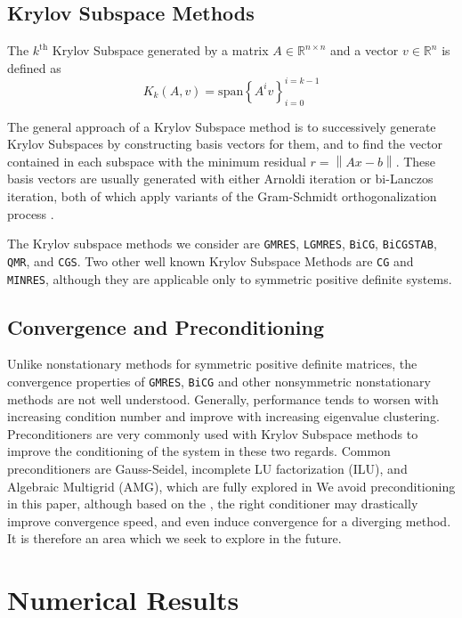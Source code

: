 \documentclass[10pt]{article}
\newcommand\norm[1]{\left\lVert #1 \right\rVert}
\begin{document}
\begin{multicols}{2}
\subsection{Krylov Subspace Methods}

The $k^{\mbox{th}}$ Krylov Subspace generated by a matrix $A \in \mathbb{R}^{n\times n}$ and a vector $v \in \mathbb{R}^n$ is defined as
\begin{equation}
	K_k(A,v) = \mbox{span}\left\{A^iv\right\}_{i=0}^{i=k-1}
\end{equation}

The general approach of a Krylov Subspace method is to successively generate Krylov Subspaces by constructing basis vectors for them, and to find the vector contained in each subspace with the minimum residual $r = \norm{Ax-b}$.
These basis vectors are usually generated with either Arnoldi iteration or bi-Lanczos iteration, both of which apply variants of the Gram-Schmidt orthogonalization process \citep{ghai_comparison_2016}.

The Krylov subspace methods we consider are \texttt{GMRES}, \texttt{LGMRES}, \texttt{BiCG}, \texttt{BiCGSTAB}, \texttt{QMR}, and \texttt{CGS}.
Two other well known Krylov Subspace Methods are \texttt{CG} and \texttt{MINRES}, although they are applicable only to symmetric positive definite systems.

\subsection{Convergence and Preconditioning}
Unlike nonstationary methods for symmetric positive definite matrices, the convergence properties of \texttt{GMRES}, \texttt{BiCG} and other nonsymmetric nonstationary methods are not well understood.
Generally, performance tends to worsen with increasing condition number and improve with increasing eigenvalue clustering.
Preconditioners are very commonly used with Krylov Subspace methods to improve the conditioning of the system in these two regards.
Common preconditioners are Gauss-Seidel, incomplete LU factorization (ILU), and Algebraic Multigrid (AMG), which are fully explored in \citet{ghai_comparison_2016}
We avoid preconditioning in this paper, although based on the \citet{ghai_comparison_2016}, the right conditioner may drastically improve convergence speed, and even induce convergence for a diverging method.
It is therefore an area which we seek to explore in the future.

\section{Numerical Results}


\end{multicols}
\end{document}

